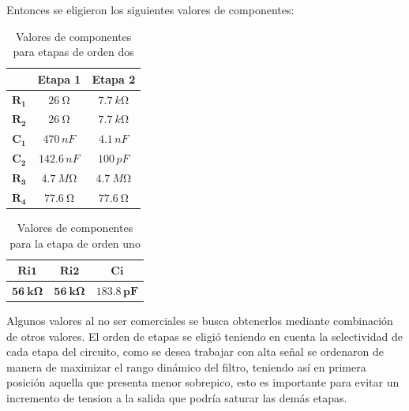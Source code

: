 \documentclass[11pt, a4paper]{article}
\begin{document}
	Entonces se eligieron los siguientes valores de componentes:
	
\begin{table}[H]
\centering
\begin{tabular}{|c|c|c|}
\hline
            & \textbf{Etapa 1} & \textbf{Etapa 2} \\ \hline
$\mathbf{R_1}$ & $\SI{26}{\ohm}$               & $\SI{7.7}{k\ohm}$             \\ \hline
$\mathbf{R_2}$ & $\SI{26}{\ohm}$               & $\SI{7.7}{k\ohm}$             \\ \hline
$\mathbf{C_1}$ & $470 \, nF$             & $4.1 \, nF$              \\ \hline
$\mathbf{C_2}$ & $142.6 \, nF$           & $100 \, pF$             \\ \hline
$\mathbf{R_3}$ & $\SI{4.7}{M\ohm}$             & $\SI{4.7}{M\ohm}$             \\ \hline
$\mathbf{R_4}$ & $\SI{77.6}{\ohm}$             & $\SI{77.6}{\ohm}$             \\ \hline
\end{tabular}
\caption{Valores de componentes para etapas de orden dos}
\label{tabla:legendreetapasorden2}
\end{table}

\begin{table}[H]
\centering
\begin{tabular}{|c|c|c|}
\hline
$\mathbf{Ri1}$ & $\mathbf{Ri2}$ & $\mathbf{Ci}$     \\ \hline
$\mathbf{\SI{56}{k\ohm}}$ & $\mathbf{\SI{56}{k\ohm}}$ & $\mathbf{183.8 \,pF}$ \\ \hline
\end{tabular}
\caption{Valores de componentes para la etapa de orden uno}
\label{tabla:legendreetapaorden1}
\end{table}
	Algunos valores al no ser comerciales se busca obtenerlos mediante combinación de otros valores.
	El orden de etapas se eligió teniendo en cuenta la selectividad de cada etapa del circuito, como se desea trabajar con alta señal se ordenaron de manera de maximizar el rango dinámico del filtro, teniendo así en primera posición aquella que presenta menor sobrepico, esto es importante para evitar un incremento de tension a la salida que podría saturar las demás etapas.
	
\end{document}
